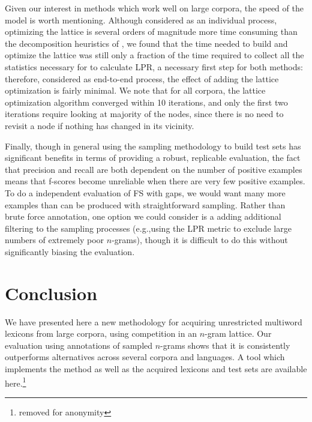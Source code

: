 \documentclass[11pt,letterpaper]{article}
\makeatletter
\def \eg {e.g.,\@ }
\makeatother
\begin{document}
Given our interest in methods which work well on large corpora, the speed of the model is worth mentioning. Although considered as an individual process, optimizing the lattice is several orders of magnitude more time consuming than the decomposition heuristics of , we found that the time needed to build and optimize the lattice was still only a fraction of the time required to collect all the statistics necessary for to calculate LPR, a necessary first step for both methods: therefore, considered as end-to-end process, the effect of adding the lattice optimization is fairly minimal. We note that for all corpora, the lattice optimization algorithm converged within 10 iterations, and only the first two iterations require looking at majority of the nodes, since there is no need to revisit a node if nothing has changed in its vicinity.

Finally, though in general using the sampling methodology to build test sets has significant benefits in terms of providing a robust, replicable evaluation, the fact that precision and recall are both dependent on the number of positive examples means that f-scores become unreliable when there are very few positive examples. To do a independent evaluation of FS with gaps, we would want many more examples than can be produced with straightforward sampling. Rather than brute force annotation, one option we could consider is a adding additional filtering to the sampling processes (\eg using the LPR metric to exclude large numbers of extremely poor $n$-grams), though it is difficult to do this without significantly biasing the evaluation.

\section{Conclusion}

We have presented here a new methodology for acquiring unrestricted multiword lexicons from large corpora, using competition in an $n$-gram lattice. Our evaluation using annotations of sampled $n$-grams shows that it is consistently outperforms alternatives across several corpora and languages. A tool which implements the method as well as the acquired lexicons and test sets are available here.\footnote{removed for anonymity} 




\end{document}
